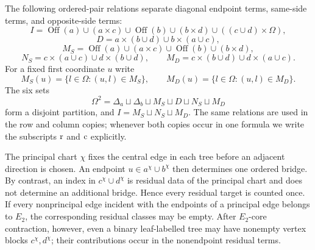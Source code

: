 \documentclass[11pt]{article}
\newcommand{\Off}{\operatorname{Off}}
\begin{document}
The following ordered-pair relations separate diagonal endpoint terms,
same-side terms, and opposite-side terms:
\[
I=\Off(a)\cup(a\times c)\cup\Off(b)\cup(b\times d)\cup((c\cup d)\times\Omega),
\]
\[
D=a\times(b\cup d)\cup b\times(a\cup c),
\]
\[
M_S=\Off(a)\cup(a\times c)\cup\Off(b)\cup(b\times d),
\]
\[
N_S=c\times(a\cup c)\cup d\times(b\cup d),
\qquad
M_D=c\times(b\cup d)\cup d\times(a\cup c).
\]
For a fixed first coordinate $u$ write
\[
M_S(u)=\{l\in\Omega:(u,l)\in M_S\},
\qquad
M_D(u)=\{l\in\Omega:(u,l)\in M_D\}.
\]
The six sets
\[
\Omega^2
=\Delta_a\sqcup\Delta_b\sqcup M_S\sqcup D\sqcup N_S\sqcup M_D
\]
form a disjoint partition, and $I=M_S\sqcup N_S\sqcup M_D$.  The same
relations are used in the row and column copies; whenever both copies occur
in one formula we write the subscripts ${\rm r}$ and ${\rm c}$ explicitly.

The principal chart $\chi$ fixes the central edge in each tree before an
adjacent direction is chosen.  An endpoint $u\in a^\chi\cup b^\chi$ then
determines one ordered bridge.  By contrast, an index in
$c^\chi\cup d^\chi$ is residual data of the principal chart and does not
determine an additional bridge.  Hence every residual target is counted once.
If every nonprincipal edge incident with the endpoints of a principal edge
belongs to $E_2$, the corresponding residual classes may be empty.  After
$E_2$-core contraction, however, even a binary leaf-labelled tree may have
nonempty vertex blocks $c^\chi,d^\chi$; their contributions occur in the
nonendpoint residual terms.
\end{document}
